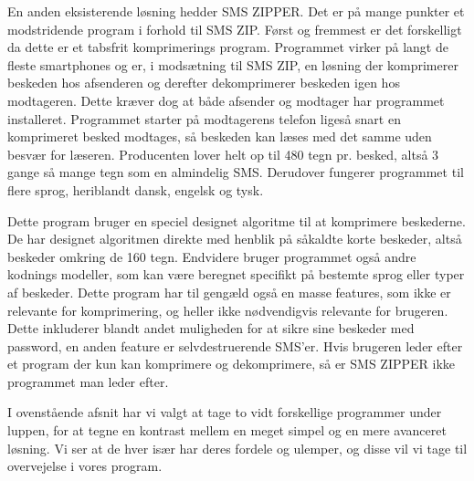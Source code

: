 En anden eksisterende løsning hedder SMS ZIPPER. Det er på mange punkter et modstridende program i forhold til SMS ZIP. Først og fremmest er det forskelligt da dette er et tabsfrit komprimerings program. Programmet virker på langt de fleste smartphones og er, i modsætning til SMS ZIP, en løsning der komprimerer beskeden hos afsenderen og derefter dekomprimerer beskeden igen hos modtageren. Dette kræver dog at både afsender og modtager har programmet installeret. Programmet starter på modtagerens telefon ligeså snart en komprimeret besked modtages, så beskeden kan læses med det samme uden besvær for læseren. Producenten lover helt op til 480 tegn pr. besked, altså 3 gange så mange tegn som en almindelig SMS. Derudover fungerer programmet til flere sprog, heriblandt dansk, engelsk og tysk.

Dette program bruger en speciel designet algoritme til at komprimere beskederne. De har designet algoritmen direkte med henblik på såkaldte korte beskeder, altså beskeder omkring de 160 tegn. Endvidere bruger programmet også andre kodnings modeller, som kan være beregnet specifikt på bestemte sprog eller typer af beskeder. Dette program har til gengæld også en masse features, som ikke er relevante for komprimering, og heller ikke nødvendigvis relevante for brugeren. Dette inkluderer blandt andet muligheden for at sikre sine beskeder med password, en anden feature er selvdestruerende SMS'er. Hvis brugeren leder efter et program der kun kan komprimere og dekomprimere, så er SMS ZIPPER ikke programmet man leder efter.\cite{smszipper} 

I ovenstående afsnit har vi valgt at tage to vidt forskellige programmer under luppen, for at tegne en kontrast mellem en meget simpel og en mere avanceret løsning. Vi ser at de hver især har deres fordele og ulemper, og disse vil vi tage til overvejelse i vores program.